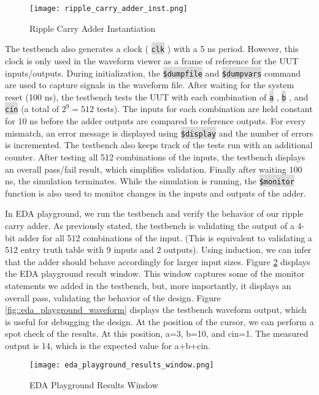 \documentclass[fleqn]{article}
\newcommand{\code}[1]{%
	\colorbox{Gainsboro}{\texttt{#1}}%
}
\begin{document}
\begin{enumerate}
		 \begin{figure}[H]
		 	\centerline{\texttt{[image: ripple\_carry\_adder\_inst.png]}}
			\caption{Ripple Carry Adder Instantiation}
			\label{fig::ripple_carry_adder_inst}
		 \end{figure}
		 
		 The testbench also generates a clock (\code{clk}) with a 5 ns period. However, this clock is only used in the waveform viewer as a frame of reference for the UUT inputs/outputs. During initialization, the \code{\$dumpfile} and \code{\$dumpvars} command are used to capture signals in the waveform file. After waiting for the system reset (100 ns), the testbench tests the UUT with each combination of \code{a}, \code{b}, and \code{cin} (a total of $2^9=512$ tests). The inputs for each combination are held constant for 10 ns before the adder outputs are compared to reference outputs. For every mismatch, an error message is displayed using \code{\$display} and the number of errors is incremented. The testbench also keeps track of the tests run with an additional counter. After testing all 512 combinations of the inputs, the testbench displays an overall pass/fail result, which simplifies validation. Finally after waiting 100 ns, the simulation terminates. While the simulation is running, the \code{\$monitor} function is also used to monitor changes in the inputs and outputs of the adder.
		  
		 In EDA playground, we run the testbench and verify the behavior of our ripple carry adder. As previously stated, the testbench is validating the output of a 4-bit adder for all 512 combinations of the input. (This is equivalent to validating a 512 entry truth table with 9 inputs and 2 outputs). Using induction, we can infer that the adder should behave accordingly for larger input sizes. Figure \ref{fig::eda_playground_results_window} displays the EDA playground result window. This window captures some of the monitor statements we added in the testbench, but, more importantly, it displays an overall pass, validating the behavior of the design. Figure \ref{fig::eda_playground_waveform} displays the testbench waveform output, which is useful for debugging the design. At the position of the cursor, we can perform a spot check of the results. At this position, a=3, b=10, and cin=1. The measured output is 14, which is the expected value for a+b+cin.
		 
		 \begin{figure}[H]
		 	\centerline{\texttt{[image: eda\_playground\_results\_window.png]}}
			\caption{EDA Playground Results Window}
			\label{fig::eda_playground_results_window}
		 \end{figure}
		 

\end{enumerate}
\end{document}
